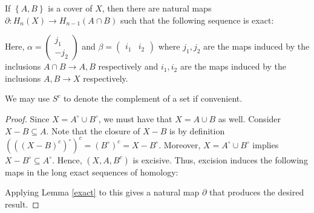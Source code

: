 \documentclass[12pt,reqno]{amsart}
\numberwithin{theorem}{section}
\theoremstyle{definition}
\theoremstyle{remark}
\numberwithin{equation}{section}
\newcommand{\set}[1]{\left \{ #1 \right \}}
\newcommand{\del}{\partial}
\theoremstyle{definition}
\begin{document}
\begin{theorem}
    If $\set{A,B}$ is a cover of $X$, then there are natural maps $\del : H_n(X) \rightarrow H_{n-1}(A\cap B)$ such that the following sequence is exact:
    \begin{center}
    \end{center}
    Here, $\alpha = \begin{pmatrix}
        j_1 \\
        -j_2
    \end{pmatrix}$ and $\beta = \begin{pmatrix}
        i_1 & i_2
    \end{pmatrix}$ where $j_1,j_2$ are the maps induced by the inclusions $A\cap B\rightarrow A,B$ respectively and $i_1,i_2$ are the maps induced by the inclusions $A,B\rightarrow X$ respectively.
\end{theorem}
We may use $S^c$ to denote the complement of a set if convenient.
\begin{proof}
Since $X = A^\circ \cup B^\circ$, we must have that $X = A\cup B$ as well. Consider $X - B\subseteq A$. Note that the closure of $X-B$ is by definition $(((X-B)^c)^\circ)^c = (B^\circ)^c =X-B^\circ $. Moreover, $X = A^\circ \cup B^\circ$ implies $X-B^\circ  \subseteq A^\circ $. Hence, $(X,A,B^c)$ is excisive. Thus, excision induces the following maps in the long exact sequences of homology:
\begin{center}
\end{center}
Applying Lemma \ref{exact} to this gives a natural map $\del$ that produces the desired result.
\end{proof}
\end{document}
